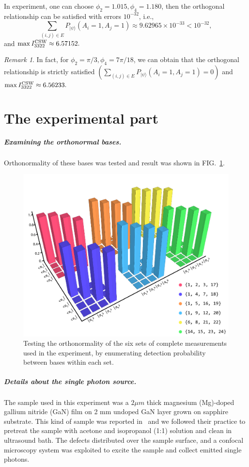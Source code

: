 \documentclass[pra,aps,notitlepage,superscriptaddress,showpacs,showkeys]{revtex4-1}
\theoremstyle{definition}
\theoremstyle{remark}
\newtheorem{remark}{Remark}
\begin{document}
In experiment, one can choose $\phi_{2}= 1.015,\phi_{4}= 1.180$, then the orthogonal relationship can be satisfied with errors $10^{-32}$, i.e.,
$$\sum_{(i,j)\in E}P_{|\psi\rangle}(A_i=1,A_j=1)\approx 9.62965\times 10^{-33}<10^{-32},$$
and $\max I_{3322}^{\rm CSW}\approx 6.57152.$

\begin{remark}
In fact, for $\phi_{2}= \pi/3,\phi_{4}=7\pi/18$, we can obtain that the orthogonal relationship is strictly satisfied  $(\sum_{(i,j)\in E}P_{|\psi\rangle}(A_i=1,A_j=1)=0)$ and $\max I_{3322}^{\rm CSW}\approx 6.56233.$
\end{remark}

\section{The experimental part}

\subparagraph{Examining the orthonormal bases.} Orthonormality of these bases was tested and result was shown in FIG.~\ref{fig:exp-res-1}.

 \begin{figure}[t]
     \centering
     \includegraphics[width = .53\columnwidth] {fig/exp-res-1.pdf}
     \caption{Testing the orthonormality of the six sets of complete measurements used in the experiment, by enumerating detection probability between bases within each set.}
     \label{fig:exp-res-1}
 \end{figure}

 \subparagraph{Details about the single photon source.}
 The sample used in this experiment was a $2\mu m$ thick magnesium (Mg)-doped gallium nitride (GaN) film on 2 mm undoped GaN layer grown on sapphire substrate.
 This kind of sample was reported in~\cite{qli18s} and we followed their practice to pretreat the sample with acetone and isopropanol (1:1) solution and clean in ultrasound bath.
 The defects distributed over the sample surface, and a confocal microscopy system was exploited to excite the sample and collect emitted single photons.
\end{document}

